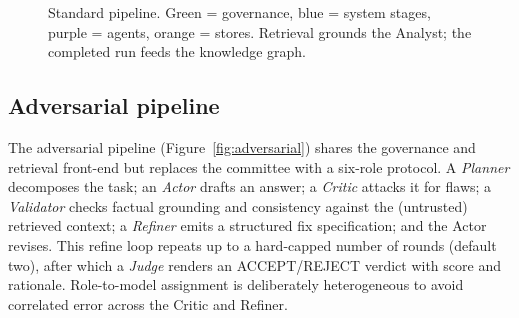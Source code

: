 \documentclass{article}
\begin{document}
\begin{figure}[t]
\centering
{}
\caption{Standard pipeline. Green = governance, blue = system stages, purple = agents,
orange = stores. Retrieval grounds the Analyst; the completed run feeds the knowledge graph.}
\label{fig:standard}
\end{figure}

\subsection{Adversarial pipeline}
\label{sec:adversarial}
The adversarial pipeline (Figure~\ref{fig:adversarial}) shares the governance and retrieval
front-end but replaces the committee with a six-role protocol. A \emph{Planner} decomposes
the task; an \emph{Actor} drafts an answer; a \emph{Critic} attacks it for flaws; a
\emph{Validator} checks factual grounding and consistency against the (untrusted) retrieved
context; a \emph{Refiner} emits a structured fix specification; and the Actor revises. This
refine loop repeats up to a hard-capped number of rounds (default two), after which a
\emph{Judge} renders an ACCEPT/REJECT verdict with score and rationale. Role-to-model
assignment is deliberately heterogeneous to avoid correlated error across the Critic and
Refiner.
\end{document}
